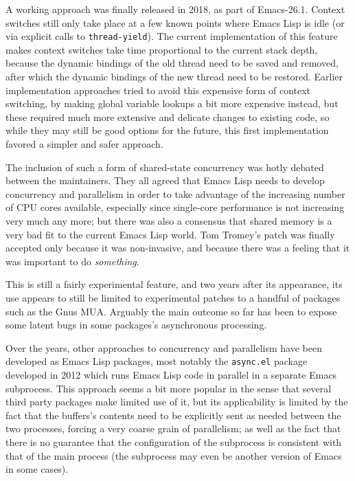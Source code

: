 \documentclass[format=acmsmall, review]{acmart}
\newcommand \Elisp {Emacs Lisp}
\begin{document}
A working approach was finally released in 2018, as part of Emacs-26.1.
Context switches still only take place at a few known points where \Elisp{}
is idle (or via explicit calls to \texttt{thread-yield}).  The current
implementation of this feature makes context switches take time proportional
to the current stack depth, because the dynamic bindings of the old thread
need to be saved and removed, after which the dynamic bindings of the new
thread need to be restored.  Earlier implementation approaches tried to
avoid this expensive form of context switching, by making global variable
lookups a bit more expensive instead, but these required much more extensive
and delicate changes to existing code, so while they may still be good
options for the future, this first implementation favored a simpler and
safer approach.

The inclusion of such a form of shared-state concurrency was hotly debated
between the maintainers.  They all agreed that \Elisp{} needs to develop
concurrency and parallelism in order to take advantage of the increasing
number of CPU cores available, especially since single-core performance is
not increasing very much any more; but there was also a consensus that
shared memory is a very bad fit to the current \Elisp{} world.  Tom Tromey's
patch was finally accepted only because it was non-invasive,
and because there was a feeling that it was important to do
\emph{something}.

This is still a fairly experimental feature, and two years after its
appearance, its use appears to still be limited to experimental patches to
a handful of packages such as the Gnus MUA.  Arguably the main outcome so
far has been to expose some latent bugs in some packages's
asynchronous processing.

Over the years, other approaches to concurrency and parallelism have been
developed as \Elisp{} packages, most notably the \texttt{async.el}
package~\cite{WiegleyAsync2019} developed in 2012 which runs \Elisp{} code
in parallel in a separate Emacs subprocess.  This approach seems a bit more
popular in the sense that several third party packages make limited use of
it, but its applicability is limited by the fact that the buffers's contents
need to be explicitly sent as needed between the two processes, forcing
a very coarse grain of parallelism; as well as the fact that there is no
guarantee that the configuration of the subprocess is consistent with that
of the main process (the subprocess may even be another version of Emacs in
some cases).
\end{document}
